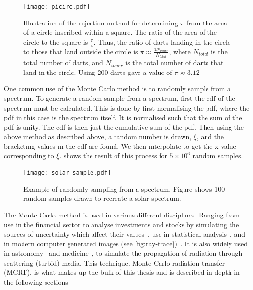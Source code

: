 \begin{figure}[!htbp]
    \centering
    \texttt{[image: picirc.pdf]}
    \caption{Illustration of the rejection method for determining $\pi$ from the area of a circle inscribed within a square. The ratio of the area of the circle to the square is $\tfrac{\pi}{4}$. Thus, the ratio of darts landing in the circle to those that land outside the circle is $\pi \approx \tfrac{4N_{inner}}{N_{total}}$, where $N_{total}$ is the total number of darts, and $N_{inner}$ is the total number of darts that land in the circle. Using 200 darts gave a value of $\pi \approx 3.12$}
    \label{fig:picircle}
\end{figure}


One common use of the Monte Carlo method is to randomly sample from a spectrum.
To generate a random sample from a spectrum, first the \gls*{cdf} of the spectrum must be calculated.
This is done by first normalising the \gls*{pdf}, where the \gls*{pdf} in this case is the spectrum itself.
It is normalised such that the sum of the \gls*{pdf} is unity.
The \gls*{cdf} is then just the cumulative sum of the \gls*{pdf}.
Then using the above method as described above, a random number is drawn, $\xi$, and the bracketing values in the \gls*{cdf} are found.
We then interpolate to get the x value corresponding to $\xi$.
 shows the result of this process for $5\times10^6$ random samples.

\begin{figure}[!htbp]
    \centering
    \texttt{[image: solar-sample.pdf]}
    \caption{Example of randomly sampling from a spectrum. Figure shows 100 random samples drawn to recreate a solar spectrum.}
    \label{fig:solar}
\end{figure}

The Monte Carlo method is used in various different disciplines. Ranging from use in the financial sector to analyse investments and stocks by simulating the sources of uncertainty which affect their values~\cite{jackel2002monte,finaceprrof}, use in statistical analysis~\cite{wall2012practical}, and in modern computer generated images (see \cref{fig:ray-trace})~\cite{Kajiyarendering,Cookraytracing}. It is also widely used in astronomy~\cite{robitaille2011hyperion,harries2014torus} and medicine~\cite{valentine2011monte,campbell2015monte}, to simulate the propagation of radiation through scattering (turbid) media. This technique, Monte Carlo radiation transfer (MCRT), is what makes up the bulk of this thesis and is described in depth in the following sections.

